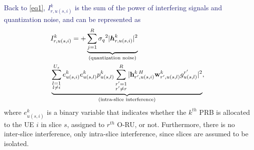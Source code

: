\documentclass[lettersize,journal]{IEEEtran}
\begin{document}
\textcolor{MidnightBlue}{Back to \eqref{eq1}, $I_{r,u(s,i)}^{k}$ is the sum of the power of interfering signals and quantization noise, and can be represented as }
\begin{align}\label{eqI}
&I_{r,u(s,i)}^{k} =+\underbrace{  \sum_{j=1}^{{R}} {\sigma_q}^2 |\boldsymbol{h}_{r,{u(s,i)}}^k|^2 }_{\text{(quantization noise)}}\nonumber\\
 &\underbrace{\sum_{\substack{l=1 \\ l\neq i}}^{{U}_{s}} e^{k}_{u(s,i)}e^{k}_{u(s,l)}  p_{u(s,l)}^{k}\sum_{\substack{r'=1 \\ r'\neq r}}^{R}|{\bold{h}_{r',u(s,i)}^{k \: H}} \bold{w}_{r',u(s,l)}^{k} g_{u(s,l)}^{r'}|^2}_{\text{(intra-slice interference)}},
\end{align}
where $e^{k}_{u(s,i)}$ is a binary variable that indicates whether the $k^{th}$ PRB is allocated to the UE $i$ in slice $s$, assigned to $r^{th}$ O-RU, or not. %
Furthermore, there is no inter-slice interference, only intra-slice interference, since slices are assumed to be isolated. 
\end{document}
